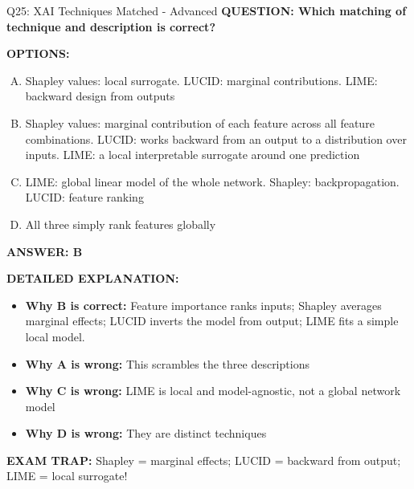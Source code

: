 \documentclass[8pt]{beamer}
\begin{document}
\begin{frame}[shrink=6]{Q25: XAI Techniques Matched - Advanced}
\fontsize{6.5}{7.5}\selectfont
\textbf{QUESTION: Which matching of technique and description is correct?}

\vspace{0.1cm}
\textbf{OPTIONS:}
\begin{enumerate}[A.]
\item Shapley values: local surrogate. LUCID: marginal contributions. LIME: backward design from outputs
\item Shapley values: marginal contribution of each feature across all feature combinations. LUCID: works backward from an output to a distribution over inputs. LIME: a local interpretable surrogate around one prediction
\item LIME: global linear model of the whole network. Shapley: backpropagation. LUCID: feature ranking
\item All three simply rank features globally
\end{enumerate}

\vspace{0.1cm}
\textcolor{myblue}{\textbf{ANSWER: B}}

\vspace{0.1cm}
\textbf{DETAILED EXPLANATION:}
\begin{itemize}
\item \textbf{Why B is correct:} Feature importance ranks inputs; Shapley averages marginal effects; LUCID inverts the model from output; LIME fits a simple local model.
\item \textbf{Why A is wrong:} This scrambles the three descriptions
\item \textbf{Why C is wrong:} LIME is local and model-agnostic, not a global network model
\item \textbf{Why D is wrong:} They are distinct techniques
\end{itemize}

\textcolor{myred}{\textbf{EXAM TRAP:}} Shapley = marginal effects; LUCID = backward from output; LIME = local surrogate!
\end{frame}
\end{document}
